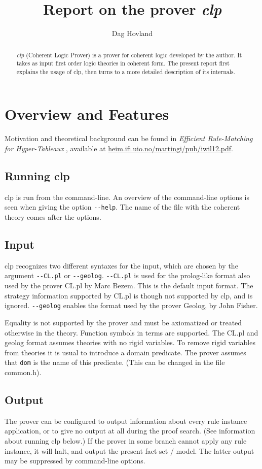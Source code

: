 \documentclass[a4paper]{article}
\author{Dag Hovland}
\title{Report on the prover \emph{clp}}
\begin{document}
\maketitle
\begin{abstract}
  \emph{clp} (Coherent Logic Prover) is a prover for coherent logic developed by the author. It takes as input first order logic theories in coherent form. The present report first explains the usage of clp, then turns to a more detailed description of its internals.
\end{abstract}
\section{Overview and Features}
Motivation and theoretical background can be found in \emph{Efficient Rule-Matching for Hyper-Tableaux
}, available at \url{heim.ifi.uio.no/martingi/pub/iwil12.pdf}.
\subsection{Running clp}
clp is run from the command-line. An overview of the command-line options is seen when giving the option \verb|--help|. The name of the file with the coherent theory comes after the options. 

\subsection{Input}
clp recognizes two different syntaxes for the input, which are chosen by the argument \verb|--CL.pl| or \verb|--geolog|. \verb|--CL.pl| is used for the prolog-like format also used by the prover CL.pl by Marc Bezem. This is the default input format. The strategy information supported by CL.pl is though not supported by clp, and is ignored. \verb|--geolog| enables the format used by the prover Geolog, by John Fisher.


Equality is not supported by the prover and must be axiomatized or treated otherwise in the theory. Function symbols in terms are supported. The CL.pl and geolog format assumes theories with no rigid variables. To remove rigid variables from theories it is usual to introduce a domain predicate. The prover assumes that \verb|dom| is the name of this predicate. (This can be changed in the file common.h). %

\subsection{Output}
The prover can be configured to output information about every rule instance application, or to give no output at all during the proof search. (See information about running clp below.) If the prover in some branch cannot apply any rule instance, it will halt, and output the present fact-set / model. The latter output may be suppressed by command-line options. 
\end{document}
